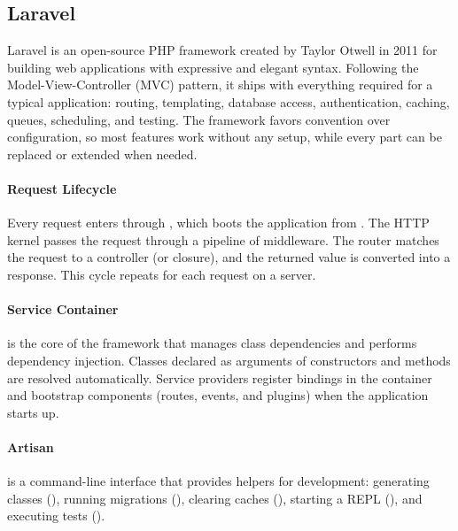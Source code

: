 
\subsection{Laravel}
 \label{laravel}

Laravel is an open-source PHP framework created by Taylor Otwell in 2011 for building web
applications with expressive and elegant syntax. Following the Model-View-Controller (MVC)
pattern, it ships with everything required for a typical application: routing, templating,
database access, authentication, caching, queues, scheduling, and testing. The framework favors
convention over configuration, so most features work without any setup, while every part can be
replaced or extended when needed.

\paragraph{Request Lifecycle} Every request enters through , which boots the
application from . The HTTP kernel passes the request through a pipeline of
middleware. The router matches the request to a controller (or closure), and the returned value
is converted into a response. This cycle repeats for each request on a server.

\paragraph{Service Container} is the core of the framework that manages class dependencies and
performs dependency injection. Classes declared as arguments of constructors and methods are
resolved automatically. Service providers register bindings in the container and bootstrap
components (routes, events, and plugins) when the application starts up.

\paragraph{Artisan} is a command-line interface that provides helpers for development:
generating classes (), running migrations
(), clearing caches (),
starting a REPL (), and executing tests ().

